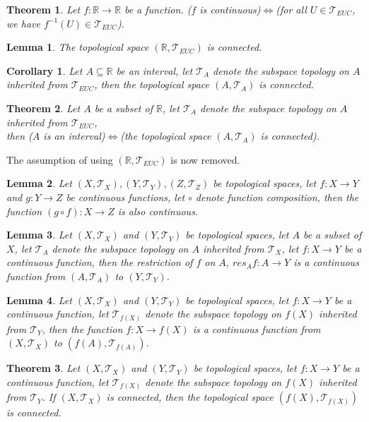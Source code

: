\documentclass[11pt]{article}
\theoremstyle{break}
\theoremstyle{break}
\newtheorem{thm}{Theorem}[section]
\newtheorem{lem}{Lemma}[thm]
\newtheorem{corL}{Corollary}[lem]
\newcommand{\R}{\mathbb{R}}
\newcommand{\T}{\mathcal{T}}
\begin{document}
	\begin{thm}
		Let $f:\R \to \R$ be a function. ($f$ is continuous)$\iff$(for all $U \in \T_{EUC}$, we have $f^{-1}(U) \in \T_{EUC}$).
	\end{thm}

	\begin{lem}
		The topological space $(\R, \T_{EUC})$ is connected.
	\end{lem}
	
	\begin{corL}
		Let $A \subseteq \R$ be an interval, let $\T_A$ denote the subspace topology on $A$ inherited from $\T_{EUC}$, then the topological space $(A,\T_A)$ is connected.
	\end{corL}
	
	\begin{thm}
		Let $A$ be a subset of $\R$, let $\T_A$ denote the subspace topology on $A$ inherited from $\T_{EUC}$,\\then ($A$ is an interval)$\iff$(the topological space $(A,\T_A)$ is connected).
	\end{thm}
	
	
	\color{red} \noindent The assumption of using $(\R, \T_{EUC})$ is now removed. \color{black}

\clearpage
	
	
	\begin{lem}
		Let $(X,\T_X),(Y,\T_Y),(Z,\T_Z)$ be topological spaces, let $f:X \to Y$ and $g:Y \to Z$ be continuous functions, let $\circ$ denote function composition, then the function $(g \circ f): X \to Z$ is also continuous.
	\end{lem}
	
	\begin{lem}
		Let $(X,\T_X)$ and $(Y,\T_Y)$ be topological spaces, let $A$ be a subset of $X$, let $\T_A$ denote the subspace topology on $A$ inherited from $\T_X$, let $f:X \to Y$ be a continuous function, then the restriction of $f$ on $A$, $res_A f : A \to Y$ is a continuous function from $(A,\T_A)$ to $(Y,\T_Y)$.
	\end{lem}
	
	\begin{lem}
		Let $(X,\T_X)$ and $(Y,\T_Y)$ be topological spaces, let $f:X \to Y$ be a continuous function, let $\T_{f(X)}$ denote the subspace topology on $f(X)$ inherited from $\T_Y$, then the function $f : X \to f(X)$ is a continuous function from $(X,\T_X)$ to $(f(A),\T_{f(A)})$.
	\end{lem}

	\begin{thm}
		Let $(X,\T_X)$ and $(Y,\T_Y)$ be topological spaces, let $f:X \to Y$ be a continuous function, let $\T_{f(X)}$ denote the subspace topology on $f(X)$ inherited from $\T_Y$. If $(X,\T_X)$ is connected, then the topological space $(f(X),\T_{f(X)})$ is connected.
	\end{thm}
	
\end{document}

